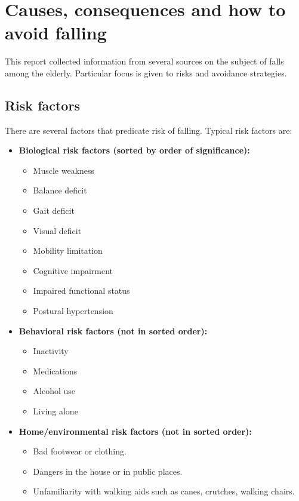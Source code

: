 \section{Causes, consequences and how to avoid falling}
This report collected information from several sources on the subject of falls among the elderly. Particular focus is given to risks and avoidance strategies.

\subsection{Risk factors}
There are several factors that predicate risk of falling. Typical risk factors are:
\begin{itemize}
\item 
\textbf{Biological risk factors (sorted by order of significance):  \cite{fallsRubenstein}}
\begin{itemize}
\item Muscle weakness
\item Balance deficit
\item Gait deficit
\item Visual deficit
\item Mobility limitation
\item Cognitive impairment
\item Impaired functional status
\item Postural hypertension
\end{itemize}
\item 
\textbf{Behavioral risk factors (not in sorted order):}
\begin{itemize}
\item Inactivity \cite{cdcComProg}
\item Medications \cite{cdcComProg}
\item Alcohol use \cite{cdcComProg}
\item Living alone \cite{housing}
\end{itemize}
\item 
\textbf{Home/environmental risk factors (not in sorted order): \cite{WHO}}
\begin{itemize}
\item Bad footwear or clothing.
\item Dangers in the house or in public places.
\item Unfamiliarity with walking aids such as canes, crutches, walking chairs.
\end{itemize}
\end{itemize}


